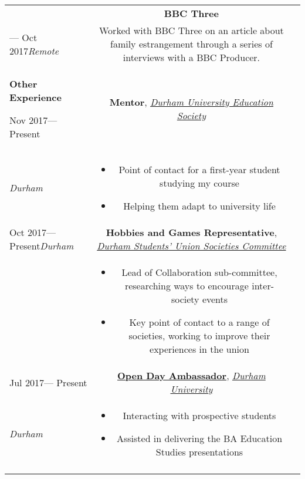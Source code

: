 \documentclass[12pt, a4paper]{article}
\newcommand{\smitem}[1]{\item {\small {#1}}}
\newenvironment{bullets}{\begin{minipage}[t]{\linewidth}\begin{itemize}[leftmargin=2em,label=-,nosep]}{\end{itemize}\end{minipage}\vspace{5pt}}
\newenvironment{sectionitem}{\vspace{6pt}\noindent\tabularx{\linewidth}{p{70pt}X}}{\endtabularx}
\newcommand{\sectionheader}[1]{
	\vspace{6pt}
	{
		\noindent
		\hspace{3pt}
		\Large\textbf{#1}}}
\begin{document}
	\begin{table}
		\noindent
		
		\begin{tabularx}{\textwidth}{XcX}
		
			\begin{minipage}[t]{\linewidth}
				\begin{sectionitem}
					Jul 2017&\textbf{BBC Three}\\
					--- Oct 2017\newline\emph{Remote}&Worked with BBC Three on an article about family estrangement through a series of interviews with a BBC Producer.\\
				\end{sectionitem}
			
				\sectionheader{Other Experience}
				
				\begin{sectionitem}
					Nov 2017\newline--- Present&\textbf{Mentor}, \href{https://www.facebook.com/DUEMS/}{\emph{Durham University Education Society}}\\
					\emph{Durham}&\begin{bullets}
						\smitem{Point of contact for a first-year student studying my course}
						\smitem{Helping them adapt to university life}
					\end{bullets}\\
				\end{sectionitem}
			
				\begin{sectionitem}
					Oct 2017\newline --- Present\newline\emph{Durham}&\textbf{Hobbies and Games Representative}, \href{https://www.durhamsu.com/societies-committee}{\emph{Durham Students' Union Societies Committee}}\\
					&\begin{bullets}
						\smitem{Lead of Collaboration sub-committee, researching ways to encourage inter-society events}
						\smitem{Key point of contact to a range of societies, working to improve their experiences in the union}
					\end{bullets}\\
				\end{sectionitem}
			
				\begin{sectionitem}
					Jul 2017\newline --- Present&\href{https://www.dur.ac.uk/asr/students/opendayambassadors/}{\textbf{Open Day Ambassador}}, \emph{\href{https://www.dur.ac.uk/}{Durham University}}\\
					\emph{Durham}&\begin{bullets}
						\smitem{Interacting with prospective students}
						\smitem{Assisted in delivering the BA Education Studies presentations}
					\end{bullets}\\
				\end{sectionitem}
			

\end{minipage}
\end{tabularx}
\end{table}
\end{document}
